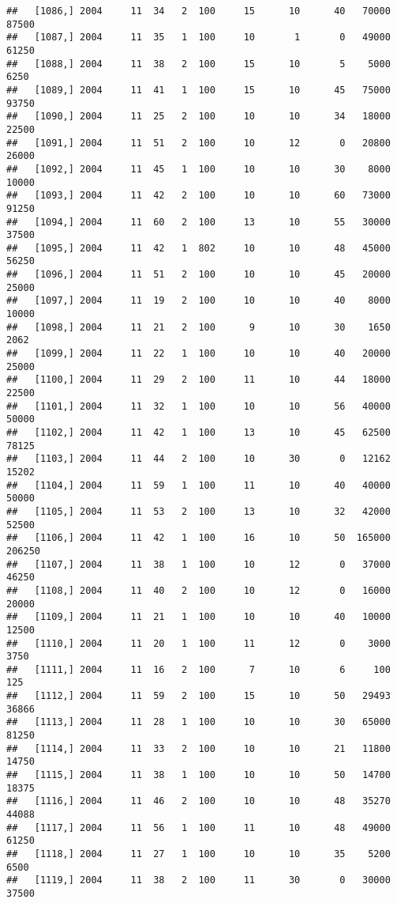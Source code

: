 \documentclass{article}\usepackage[]{graphicx}\usepackage[]{color}
\makeatletter
\newenvironment{kframe}{%
 \def\at@end@of@kframe{}%
 \ifinner\ifhmode%
  \def\at@end@of@kframe{\end{minipage}}%
  \begin{minipage}{\columnwidth}%
 \fi\fi%
 \def\FrameCommand##1{\hskip\@totalleftmargin \hskip-\fboxsep
 \colorbox{shadecolor}{##1}\hskip-\fboxsep
     \hskip-\linewidth \hskip-\@totalleftmargin \hskip\columnwidth}%
 \MakeFramed {\advance\hsize-\width
   \@totalleftmargin\z@ \linewidth\hsize
   \@setminipage}}%
 {\par\unskip\endMakeFramed%
 \at@end@of@kframe}
\newenvironment{knitrout}{}{} %
\makeatother
\begin{document}
\begin{knitrout}
\begin{kframe}
\begin{verbatim}
##   [1086,] 2004     11  34   2  100     15      10      40   70000   87500
##   [1087,] 2004     11  35   1  100     10       1       0   49000   61250
##   [1088,] 2004     11  38   2  100     15      10       5    5000    6250
##   [1089,] 2004     11  41   1  100     15      10      45   75000   93750
##   [1090,] 2004     11  25   2  100     10      10      34   18000   22500
##   [1091,] 2004     11  51   2  100     10      12       0   20800   26000
##   [1092,] 2004     11  45   1  100     10      10      30    8000   10000
##   [1093,] 2004     11  42   2  100     10      10      60   73000   91250
##   [1094,] 2004     11  60   2  100     13      10      55   30000   37500
##   [1095,] 2004     11  42   1  802     10      10      48   45000   56250
##   [1096,] 2004     11  51   2  100     10      10      45   20000   25000
##   [1097,] 2004     11  19   2  100     10      10      40    8000   10000
##   [1098,] 2004     11  21   2  100      9      10      30    1650    2062
##   [1099,] 2004     11  22   1  100     10      10      40   20000   25000
##   [1100,] 2004     11  29   2  100     11      10      44   18000   22500
##   [1101,] 2004     11  32   1  100     10      10      56   40000   50000
##   [1102,] 2004     11  42   1  100     13      10      45   62500   78125
##   [1103,] 2004     11  44   2  100     10      30       0   12162   15202
##   [1104,] 2004     11  59   1  100     11      10      40   40000   50000
##   [1105,] 2004     11  53   2  100     13      10      32   42000   52500
##   [1106,] 2004     11  42   1  100     16      10      50  165000  206250
##   [1107,] 2004     11  38   1  100     10      12       0   37000   46250
##   [1108,] 2004     11  40   2  100     10      12       0   16000   20000
##   [1109,] 2004     11  21   1  100     10      10      40   10000   12500
##   [1110,] 2004     11  20   1  100     11      12       0    3000    3750
##   [1111,] 2004     11  16   2  100      7      10       6     100     125
##   [1112,] 2004     11  59   2  100     15      10      50   29493   36866
##   [1113,] 2004     11  28   1  100     10      10      30   65000   81250
##   [1114,] 2004     11  33   2  100     10      10      21   11800   14750
##   [1115,] 2004     11  38   1  100     10      10      50   14700   18375
##   [1116,] 2004     11  46   2  100     10      10      48   35270   44088
##   [1117,] 2004     11  56   1  100     11      10      48   49000   61250
##   [1118,] 2004     11  27   1  100     10      10      35    5200    6500
##   [1119,] 2004     11  38   2  100     11      30       0   30000   37500

\end{verbatim}
\end{kframe}
\end{knitrout}
\end{document}
